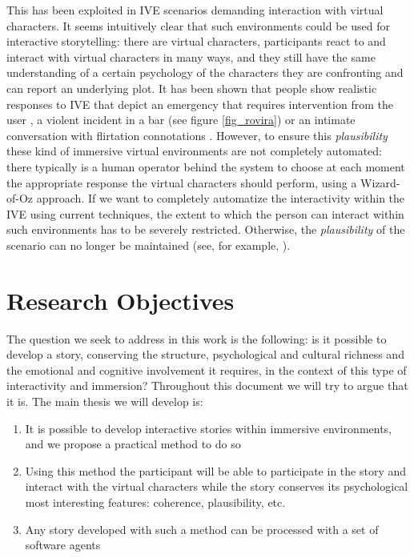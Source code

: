 \documentclass[
		twoside,openright,titlepage,numbers=noenddot,manychapters,
		headinclude,%
                footinclude=false,cleardoublepage=empty,
                BCOR=5mm,
		fontsize=11pt, %
                 enabledeprecatedfontcommands]{scrreprt}
\begin{document}
This has been exploited in IVE scenarios demanding interaction with virtual characters. It seems intuitively clear that such environments could be used for interactive storytelling: there are virtual characters, participants react to and interact with virtual characters in many ways, and they still have the same understanding of a certain psychology of the characters they are confronting and can report an underlying plot. 
 It has been shown that people show realistic responses to IVE that depict an emergency that requires intervention from the user \cite[]{herbelin2005bes},  a violent incident in a bar \cite[]{ rovira2009use} (see figure \ref{fig_rovira})
 or an intimate conversation with flirtation connotations \cite[]{pan2012}.  However, to ensure this \emph{plausibility} these kind of immersive virtual environments are not completely automated: there typically is a human operator behind the system to choose at each moment the appropriate response the virtual characters should perform, using a  Wizard-of-Oz approach.
If we want to completely automatize the interactivity within the IVE using current techniques, the extent to which the person can interact within such environments has to be severely restricted. Otherwise, the \emph{plausibility} of the scenario can no longer be maintained (see, for example, \cite{Zerroug2008}). 





\section{Research Objectives}
The question we seek to address in this work is the following:  is it possible to develop a story, conserving the structure, psychological and cultural richness and the emotional and cognitive involvement it requires, in the context of this type of interactivity and immersion? Throughout this document we will try to argue that it is.
The main thesis we will develop is:
 \begin{enumerate}
   \item It is possible to develop interactive stories within immersive environments, and we propose a practical method to do so %
   \item %
Using this method the participant will be able to participate in the story and interact with the virtual characters while the story conserves its psychological most interesting features: coherence, plausibility, etc.
   \item Any story developed with such a method can be processed with a set of software agents %
 \end{enumerate}
\end{document}
